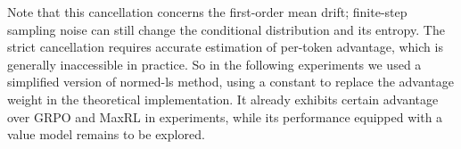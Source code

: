 Note that this cancellation concerns the first-order mean drift; finite-step sampling noise can still change the conditional distribution and its entropy. The strict cancellation requires accurate estimation of per-token advantage, which is generally inaccessible in practice. So in the following experiments we used a simplified version of normed-ls method, using a constant to replace the advantage weight in the theoretical implementation. It already exhibits certain advantage over GRPO and MaxRL in experiments, while its performance equipped with a value model remains to be explored.



